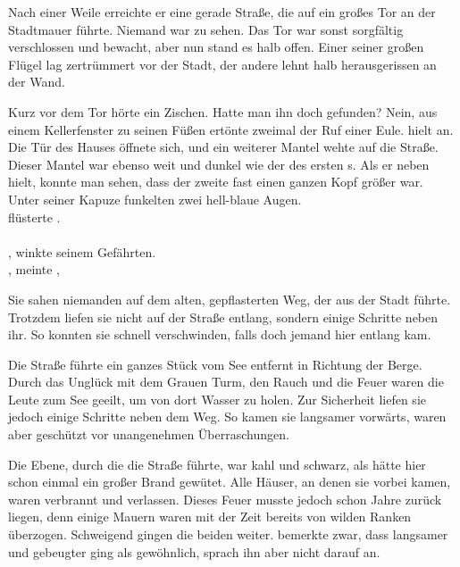 \begin{huge}
Nach einer Weile erreichte er eine gerade Straße, die auf ein großes Tor an der Stadtmauer führte. Niemand war zu sehen. Das Tor war sonst sorgfältig verschlossen und bewacht, aber nun stand es halb offen. Einer seiner großen Flügel lag zertrümmert vor der Stadt, der andere lehnt halb herausgerissen an der Wand. 

Kurz vor dem Tor hörte {\Eno} ein Zischen. Hatte man ihn doch gefunden? Nein, aus einem Kellerfenster zu seinen Füßen ertönte zweimal der Ruf einer Eule. {\Eno} hielt an. Die Tür des Hauses öffnete sich, und ein weiterer Mantel wehte auf die Straße. Dieser Mantel war ebenso weit und dunkel wie der des ersten {\Schattenlaufer}s. Als er neben {\Eno} hielt, konnte man sehen, dass der zweite {\Schattenlaufer} fast einen ganzen Kopf größer war. Unter seiner Kapuze funkelten zwei hell-blaue Augen.\\
\q{{\Bomar}!} flüsterte {\Eno}. \\
\\
, {\Eno} winkte seinem Gefährten. \\
, meinte {\Bomar}, \\

Sie sahen niemanden auf dem alten, gepflasterten Weg, der aus der Stadt führte. Trotzdem liefen sie nicht auf der Straße entlang, sondern einige Schritte neben ihr. So konnten sie schnell verschwinden, falls doch jemand hier entlang kam. 

Die Straße führte ein ganzes Stück vom See entfernt in Richtung der Berge. Durch das Unglück mit dem Grauen Turm, den Rauch und die Feuer waren die Leute zum See geeilt, um von dort Wasser zu holen. Zur Sicherheit liefen sie jedoch einige Schritte neben dem Weg. So kamen sie langsamer vorwärts, waren aber geschützt vor unangenehmen Überraschungen.

Die Ebene, durch die die Straße führte, war kahl und schwarz, als hätte hier schon einmal ein großer Brand gewütet. Alle Häuser, an denen sie vorbei kamen, waren verbrannt und verlassen. Dieses Feuer musste jedoch schon Jahre zurück liegen, denn einige Mauern waren mit der Zeit bereits von wilden Ranken überzogen. Schweigend gingen die beiden {\Schattenlaufer} weiter. {\Bomar} bemerkte zwar, dass {\Eno} langsamer und gebeugter ging als gewöhnlich, sprach ihn aber nicht darauf an.


\end{huge}
